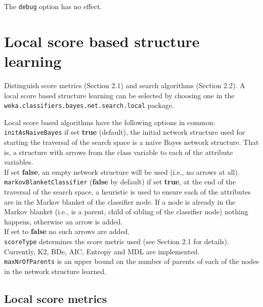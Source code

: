 The {\tt debug} option has no effect.

\section{Local score based structure learning\label{sec.score}}

Distinguish score metrics (Section 2.1) and search algorithms (Section 2.2).
A local score based structure learning can be selected by choosing one in the
{\tt weka.classifiers.bayes.net.search.local} package.

\begin{center}
\end{center}


Local score based algorithms have the following options in common:\\
{\tt initAsNaiveBayes} if set {\bf true} (default), the initial network structure used
for starting the traversal of the search space is a naive Bayes network 
structure. That is, a structure with arrows from the class variable to
each of the attribute variables.\\
If set {\bf false}, an empty network structure will be used (i.e., no arrows at all).\\
{\tt markovBlanketClassifier} (\textbf{false} by default) if set {\bf true},
at the end of the traversal of the search space, a heuristic is used
to ensure each of the attributes are in the Markov blanket of the 
classifier node. If a node is already in the Markov blanket (i.e., is
a parent, child of sibling of the classifier node) nothing happens,
otherwise an arrow is added.\\
If set to {\bf false} no such arrows are added.\\
{\tt scoreType} determines the score metric used (see Section 2.1
for details). Currently, K2, BDe, AIC, Entropy and MDL are implemented.\\
{\tt maxNrOfParents} is an upper bound on the number of parents of each of the
nodes in the network structure learned.

\subsection{Local score metrics \label{sec.score.metric}}

